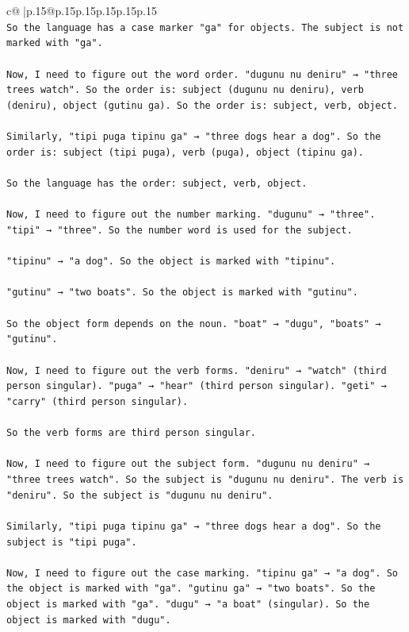 \documentclass{article}
\begin{document}
{\begin{supertabular}{c@{$\;$}|p{.15\linewidth}@{}p{.15\linewidth}p{.15\linewidth}p{.15\linewidth}p{.15\linewidth}p{.15\linewidth}}
{{{\\ 
\texttt{So the language has a case marker "ga" for objects. The subject is not marked with "ga".} \\
\\ 
\texttt{Now, I need to figure out the word order. "dugunu nu deniru" → "three trees watch". So the order is: subject (dugunu nu deniru), verb (deniru), object (gutinu ga). So the order is: subject, verb, object.} \\
\\ 
\texttt{Similarly, "tipi puga tipinu ga" → "three dogs hear a dog". So the order is: subject (tipi puga), verb (puga), object (tipinu ga).} \\
\\ 
\texttt{So the language has the order: subject, verb, object.} \\
\\ 
\texttt{Now, I need to figure out the number marking. "dugunu" → "three". "tipi" → "three". So the number word is used for the subject.} \\
\\ 
\texttt{"tipinu" → "a dog". So the object is marked with "tipinu".} \\
\\ 
\texttt{"gutinu" → "two boats". So the object is marked with "gutinu".} \\
\\ 
\texttt{So the object form depends on the noun. "boat" → "dugu", "boats" → "gutinu".} \\
\\ 
\texttt{Now, I need to figure out the verb forms. "deniru" → "watch" (third person singular). "puga" → "hear" (third person singular). "geti" → "carry" (third person singular).} \\
\\ 
\texttt{So the verb forms are third person singular.} \\
\\ 
\texttt{Now, I need to figure out the subject form. "dugunu nu deniru" → "three trees watch". So the subject is "dugunu nu deniru". The verb is "deniru". So the subject is "dugunu nu deniru".} \\
\\ 
\texttt{Similarly, "tipi puga tipinu ga" → "three dogs hear a dog". So the subject is "tipi puga".} \\
\\ 
\texttt{Now, I need to figure out the case marking. "tipinu ga" → "a dog". So the object is marked with "ga". "gutinu ga" → "two boats". So the object is marked with "ga". "dugu" → "a boat" (singular). So the object is marked with "dugu".} \\
}}}
\end{supertabular}}
\end{document}

